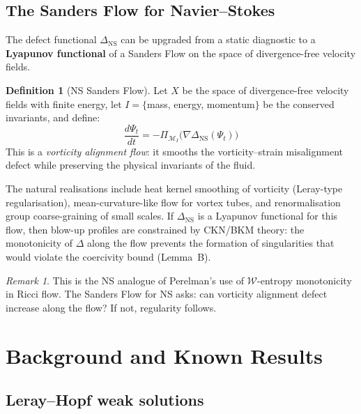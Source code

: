 \documentclass[11pt]{article}
\theoremstyle{definition}
\newtheorem{definition}[theorem]{Definition}
\theoremstyle{remark}
\newtheorem{remark}[theorem]{Remark}
\begin{document}
\subsection*{The Sanders Flow for Navier--Stokes}

The defect functional $\Delta_{\mathrm{NS}}$ can be upgraded from a static diagnostic
to a \textbf{Lyapunov functional} of a Sanders Flow on the space of divergence-free
velocity fields.

\begin{definition}[NS Sanders Flow]
Let $X$ be the space of divergence-free velocity fields with finite energy, let
$I = \{$mass, energy, momentum$\}$ be the conserved invariants, and define:
\[
  \frac{d\Psi_t}{dt} = -\Pi_{\mathcal{M}_I}\!\bigl(\nabla \Delta_{\mathrm{NS}}(\Psi_t)\bigr)
\]
This is a \emph{vorticity alignment flow}: it smooths the vorticity--strain misalignment
defect while preserving the physical invariants of the fluid.
\end{definition}

\noindent
The natural realisations include heat kernel smoothing of vorticity (Leray-type
regularisation), mean-curvature-like flow for vortex tubes, and renormalisation group
coarse-graining of small scales. If $\Delta_{\mathrm{NS}}$ is a Lyapunov functional
for this flow, then blow-up profiles are constrained by CKN/BKM theory: the monotonicity
of $\Delta$ along the flow prevents the formation of singularities that would violate
the coercivity bound (Lemma~B).

\begin{remark}
This is the NS analogue of Perelman's use of $\mathcal{W}$-entropy monotonicity in
Ricci flow. The Sanders Flow for NS asks: can vorticity alignment defect increase
along the flow? If not, regularity follows.
\end{remark}

\section{Background and Known Results}
\label{sec:background}

\subsection{Leray--Hopf weak solutions}
\end{document}
